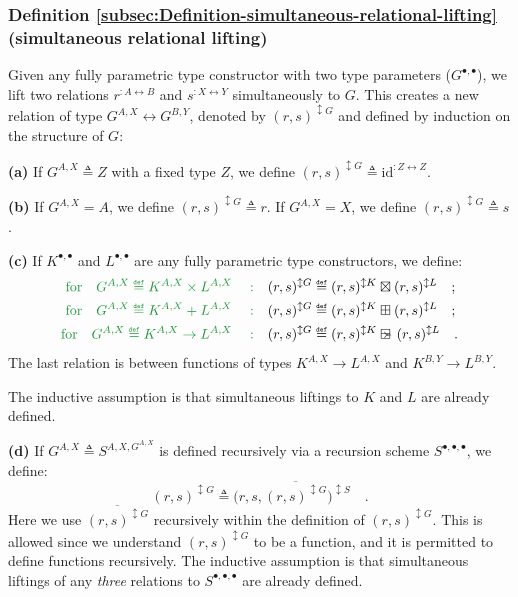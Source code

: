 \subsubsection{Definition \label{subsec:Definition-simultaneous-relational-lifting}\ref{subsec:Definition-simultaneous-relational-lifting}
(simultaneous relational lifting)}

Given any fully parametric type constructor with two type parameters
($G^{\bullet,\bullet}$), we lift two relations $r^{:A\leftrightarrow B}$
and $s^{:X\leftrightarrow Y}$ simultaneously to $G$. This creates
a new relation of type $G^{A,X}\leftrightarrow G^{B,Y}$, denoted
by $(r,s)^{\updownarrow G}$ and defined by induction on the structure
of $G$:

\textbf{(a)} If $G^{A,X}\triangleq Z$ with a fixed type $Z$, we
define $(r,s)^{\updownarrow G}\triangleq\text{id}^{:Z\leftrightarrow Z}$.

\textbf{(b)} If $G^{A,X}=A$, we define $(r,s)^{\updownarrow G}\triangleq r$.
If $G^{A,X}=X$, we define $(r,s)^{\updownarrow G}\triangleq s$.

\textbf{(c)} If $K^{\bullet,\bullet}$ and $L^{\bullet,\bullet}$
are any fully parametric type constructors, we define: 
\begin{align*}
{\color{greenunder}\text{for}\quad G^{A,X}\triangleq K^{A,X}\times L^{A,X}\quad:}\quad & (r,s)^{\updownarrow G}\triangleq(r,s)^{\updownarrow K}\boxtimes(r,s)^{\updownarrow L}\quad;\\
{\color{greenunder}\text{for}\quad G^{A,X}\triangleq K^{A,X}+L^{A,X}\quad:}\quad & (r,s)^{\updownarrow G}\triangleq(r,s)^{\updownarrow K}\boxplus(r,s)^{\updownarrow L}\quad;\\
{\color{greenunder}\text{for}\quad G^{A,X}\triangleq K^{A,X}\rightarrow L^{A,X}\quad:}\quad & (r,s)^{\updownarrow G}\triangleq(r,s)^{\updownarrow K}\ogreaterthan(r,s)^{\updownarrow L}\quad.
\end{align*}
The last relation is between functions of types $K^{A,X}\rightarrow L^{A,X}$
and $K^{B,Y}\rightarrow L^{B,Y}$. 

The inductive assumption is that simultaneous liftings to $K$ and
$L$ are already defined.

\textbf{(d)} If $G^{A,X}\triangleq S^{A,X,G^{A,X}}$ is defined recursively
via a recursion scheme $S^{\bullet,\bullet,\bullet}$, we define:
\[
(r,s)^{\updownarrow G}\triangleq\big(r,s,\overline{(r,s)^{\updownarrow G}}\big)^{\updownarrow S}\quad.
\]
Here we use $\overline{(r,s)^{\updownarrow G}}$ recursively within
the definition of $(r,s)^{\updownarrow G}$. This is allowed since
we understand $(r,s)^{\updownarrow G}$ to be a function, and it is
permitted to define functions recursively. The inductive assumption
is that simultaneous liftings of any \emph{three} relations to $S^{\bullet,\bullet,\bullet}$
are already defined. 

